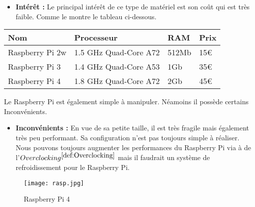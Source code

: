         \begin{flushleft}
            \begin{itemize}
                \item \textbf{Intérêt :}
                Le principal intérêt de ce type de matériel est son coût qui est très faible. Comme le montre le tableau ci-dessous.
            \end{itemize}                       

            \begin{center}
                \begin{tabular}{ |p{3cm}|p{3cm}|p{3cm}|p{3cm}|  }
                    \hline
                    Nom & Processeur & RAM & Prix\\
                    \hline
                    Raspberry Pi 2w & 1.5 GHz Quad-Core A72 & 512Mb & 15€\\
                    \hline
                    Raspberry Pi 3 & 1.4 GHz Quad-Core A53 & 1Gb & 35€\\
                    \hline
                    Raspberry Pi 4 & 1.8 GHz Quad-Core A72 & 2Gb & 45€\\
                    \hline
                \end{tabular}            
            \end{center}

            Le Raspberry Pi est également simple à manipuler. Néamoins il possède certains Inconvénients.

            \begin{center}
                \begin{itemize}
                    \item \textbf{Inconvénients :}
                    En vue de sa petite taille, il est très fragile mais également très peu performant.
                    Sa configuration n'est pas toujours simple à réaliser.
                    Nous pouvons toujours augmenter les performances du Raspberry Pi via à de l'\underline{$ Overclocking^{\ref{def:Overclocking}}$} mais il faudrait un système de refroidissement pour le Raspberry Pi.
                \end{itemize}
            \end{center}


        \end{flushleft}     
            
        \begin{figure}[ht]
            \centering
            \texttt{[image: rasp.jpg]}
            \caption{Raspberry Pi 4}
        \end{figure}
        
